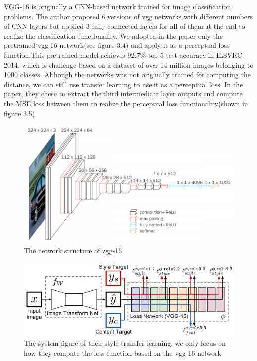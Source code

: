 \documentclass[a4paper,12pt,twoside]{report}
\begin{document}
VGG-16\cite{simonyan2014very} is originally a CNN-based network trained for image classification problems. The author proposed 6 versions of vgg networks with different numbers of CNN layers but applied 3 fully connected layers for all of them at the end to realize the classification functionality. We adopted in the paper only the pretrained vgg-16 network(see figure 3.4) and apply it as a perceptual loss function.This pretrained model achieves 92.7\% top-5 test accuracy in ILSVRC-2014, which is challenge based on a dataset of over 14 million images belonging to 1000 classes. Although the networks was not originally trained for computing the distance, we can still use transfer learning to use it as a perceptual loss. In the paper\cite{johnson2016perceptual}, they chose to extract the third intermediate layer outputs and compute the MSE loss between them to realize the perceptual loss functionality(shown in figure 3.5)
\begin{figure}
\centering
\includegraphics[width=1.0\textwidth]{vgg16.png}
\caption{The network structure of vgg-16}
\end{figure}
\begin{figure}
\centering
\includegraphics[width=1.0\textwidth]{SystemFigure.pdf}
\caption{The system figure of their style transfer learning, we only focus on how they compute the loss function based on the vgg-16 network}
\end{figure}
\end{document}
